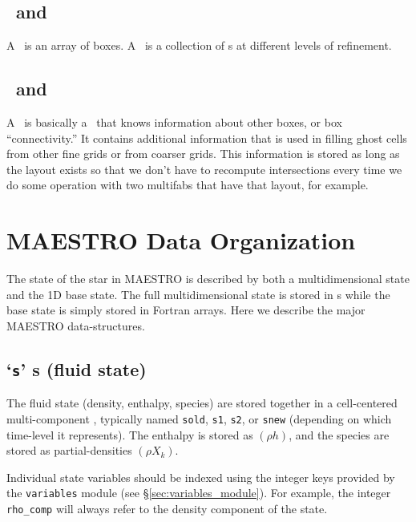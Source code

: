 \subsection{\boxarray\ and \mlboxarray}

A \boxarray\ is an array of boxes.  A \mlboxarray\ is a collection of
\boxarray s at different levels of refinement.

\subsection{\layout\ and \mllayout}

A \layout\ is basically a \boxarray\ that knows information about other
boxes, or box ``connectivity.''  It contains additional information
that is used in filling ghost cells from other fine grids or from
coarser grids.  This information is stored as long as the layout
exists so that we don't have to recompute intersections every time we
do some operation with two multifabs that have that layout, for
example.


\subsection{\bctower}


\section{MAESTRO Data Organization}

The state of the star in MAESTRO is described by both a
multidimensional state and the 1D base state.  The full
multidimensional state is stored in \multifab s while the base state
is simply stored in Fortran arrays.  Here we describe the
major MAESTRO data-structures.

\subsection{`{\tt s}' \multifab s (fluid state)}

The fluid state (density, enthalpy, species) are stored together in a
cell-centered multi-component \multifab, typically named {\tt sold},
{\tt s1}, {\tt s2}, or {\tt snew} (depending on which time-level it
represents).  The enthalpy is stored as $(\rho h)$, and the species
are stored as partial-densities $(\rho X_k)$.

Individual state variables should be indexed using the integer keys provided 
by the {\tt variables} module (see \S \ref{sec:variables_module}).  For example,
the integer {\tt rho\_comp} will always refer to the density component of the state.


